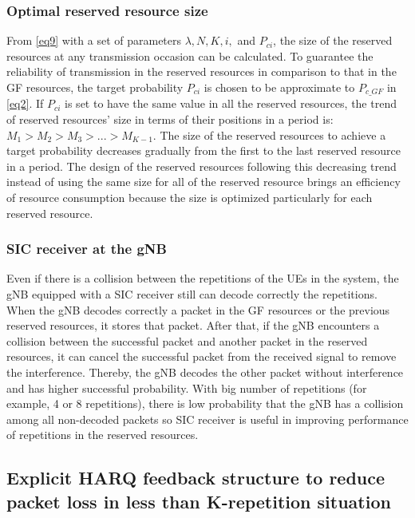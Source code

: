 \documentclass{ieeeaccess}
\begin{document}
\subsubsection{Optimal reserved resource size}

From \eqref{eq9} with a set of parameters  $\lambda, N, K, i,$ and $P_{ci}$, the size of the reserved resources at any transmission occasion can be calculated. To guarantee the reliability of transmission in the reserved resources in comparison to that in the GF resources, the target probability $P_{ci}$ is chosen to be approximate to $P_{c\_GF}$ in \eqref{eq2}. If $P_{ci}$ is set to have the same value in all the reserved resources, the trend of reserved resources' size in terms of their positions in a period is: $M_1 > M_2 > M_3 > ... > M_{K-1}$. The size of the reserved resources to achieve a target probability decreases gradually from the first to the last reserved resource in a period. The design of the reserved resources following this decreasing trend instead of using the same size for all of the reserved resource brings an efficiency of resource consumption because the size is optimized particularly for each reserved resource.

\subsubsection{SIC receiver at the gNB}

Even if there is a collision between the repetitions of the UEs in the system, the gNB equipped with a SIC receiver still can decode correctly the repetitions. When the gNB decodes correctly a packet in the GF resources or the previous reserved resources, it stores that packet. After that, if the gNB encounters a collision between the successful packet and another packet in the reserved resources, it can cancel the successful packet from the received signal to remove the interference. Thereby, the gNB decodes the other packet without interference and has higher successful probability. With big number of repetitions (for example, 4 or  8 repetitions), there is low probability that the gNB has a collision among all non-decoded packets so SIC receiver is useful in improving performance of repetitions in the reserved resources.

\subsection{Explicit HARQ feedback structure to reduce packet loss in less than K-repetition situation}\label{IIIC}
\end{document}
